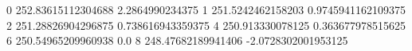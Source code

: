 0 252.83615112304688 2.2864990234375
1 251.5242462158203 0.9745941162109375
2 251.28826904296875 0.738616943359375
4 250.913330078125 0.363677978515625
6 250.54965209960938 0.0
8 248.47682189941406 -2.0728302001953125
